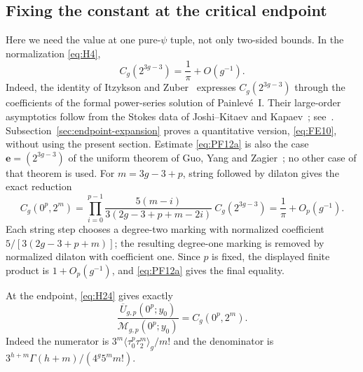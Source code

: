 \subsection{Fixing the constant at the critical endpoint}\label{sec:prefactor-endpoint}

Here we need the value at one pure-$\psi$ tuple, not only two-sided
bounds. In the normalization \eqref{eq:H4},
\begin{equation}
 C_g(2^{3g-3})=\frac1\pi+O(g^{-1}).
 \label{eq:PF12a}
\end{equation}
Indeed, the identity of Itzykson and Zuber~\cite[equation~(6.10)]{IZ}
expresses $C_g(2^{3g-3})$ through the coefficients of the formal
power-series solution of Painlev\'e~I.
Their large-order asymptotics follow from the Stokes data of Joshi--Kitaev
and Kapaev~\cite{JK,Kap}; see~\cite[Section~2.3]{GIKM}.
Subsection~\ref{sec:endpoint-expansion} proves a quantitative version,
\eqref{eq:FE10}, without using the present section. Estimate
\eqref{eq:PF12a} is also the case $\mathbf e=(2^{3g-3})$ of the uniform
theorem of Guo, Yang and Zagier~\cite[Theorem~1]{GYZ}; no other case of
that theorem is used.
For $m=3g-3+p$, string followed by dilaton gives the exact reduction
\begin{equation}
 C_g(0^p,2^m)=
 \prod_{i=0}^{p-1}
 \frac{5(m-i)}{3(2g-3+p+m-2i)}\ C_g(2^{3g-3})
 =\frac1\pi+O_p(g^{-1}).
 \label{eq:PF12}
\end{equation}
Each string step chooses a degree-two marking with normalized
coefficient $5/[3(2g-3+p+m)]$; the resulting degree-one marking is
removed by normalized dilaton with coefficient one. Since $p$ is fixed,
the displayed finite product is $1+O_p(g^{-1})$, and \eqref{eq:PF12a}
gives the final equality.

At the endpoint, \eqref{eq:H24} gives exactly
\begin{equation}
 \frac{\overline U_{g,p}(0^p;y_0)}
      {\mathcal M_{g,p}(0^p;y_0)}=C_g(0^p,2^m).
 \label{eq:PF13}
\end{equation}
Indeed the numerator is $3^m\langle\tau_0^p\tau_2^m\rangle_g/m!$
and the denominator is
$3^{h+m}\Gamma(h+m)/(4^g5^m m!)$.

